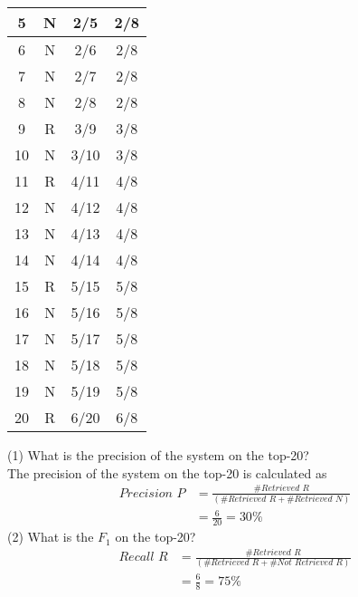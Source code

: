 \documentclass[12pt, letterpaper, twoside]{article}
\begin{document}
\begin{enumerate}
\begin{center}
\begin{tabular}{||c | c | c | c||}
    \hline
    5 & N & 2/5 & 2/8\\
    \hline
    6 & N & 2/6 & 2/8\\
    \hline
    7 & N & 2/7 & 2/8\\
    \hline
    8 & N & 2/8 & 2/8\\
    \hline
    9 & R & 3/9 & 3/8\\
    \hline
    10 & N & 3/10 & 3/8\\
    \hline
    11 & R & 4/11 & 4/8\\
    \hline
    12 & N & 4/12 & 4/8\\
    \hline
    13 & N & 4/13 & 4/8\\
    \hline
    14 & N & 4/14 & 4/8\\
    \hline
    15 & R & 5/15 & 5/8\\
    \hline
    16 & N & 5/16 & 5/8\\
    \hline
    17 & N & 5/17 & 5/8\\
    \hline
    18 & N & 5/18 & 5/8\\
    \hline
    19 & N & 5/19 & 5/8\\
    \hline
    20 & R & 6/20 & 6/8\\ %
    \hline
    \end{tabular}
    \end{center}

        (1) What is the precision of the system on the top-20?\\
        The precision of the system on the top-20 is calculated as
        \begin{equation}
        \begin{split}
             \textit{Precision P} & = \frac{\textit{\# Retrieved R}}{(\textit{\# Retrieved R} + \textit{\# Retrieved N})}\\
            & = \frac{6}{20} = 30\%
        \end{split}
        \end{equation}
        \newpage
        (2) What is the $F_1$ on the top-20?\\
        \begin{equation}
        \begin{split}
            \textit{Recall R} & = \frac{\textit{\# Retrieved R}}{(\textit{\# Retrieved R} + \textit{\# Not Retrieved R})}\\
            & = \frac{6}{8} = 75\%
        \end{split}
        \end{equation}


\end{enumerate}
\end{document}
